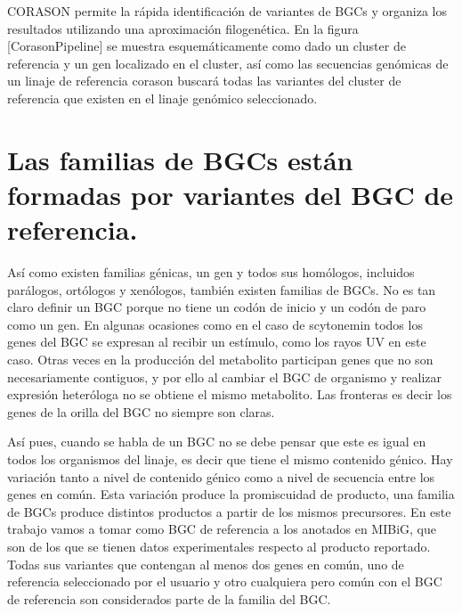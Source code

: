 \documentclass[12pt,twoside]{reedthesis}
\begin{document}
  CORASON permite la rápida identificación de variantes de BGCs y organiza
  los resultados utilizando una aproximación filogenética. En la figura
  {[}CorasonPipeline{]} se muestra esquemáticamente como dado un cluster
  de referencia y un gen localizado en el cluster, así como las secuencias
  genómicas de un linaje de referencia corason buscará todas las variantes
  del cluster de referencia que existen en el linaje genómico
  seleccionado.
  
  \section{Las familias de BGCs están formadas por variantes del BGC de
  referencia.}\label{las-familias-de-bgcs-estan-formadas-por-variantes-del-bgc-de-referencia.}
  
  Así como existen familias génicas, un gen y todos sus homólogos,
  incluidos parálogos, ortólogos y xenólogos, también existen familias de
  BGCs. No es tan claro definir un BGC porque no tiene un codón de inicio
  y un codón de paro como un gen. En algunas ocasiones como en el caso de
  scytonemin todos los genes del BGC se expresan al recibir un estímulo,
  como los rayos UV en este caso. Otras veces en la producción del
  metabolito participan genes que no son necesariamente contiguos, y por
  ello al cambiar el BGC de organismo y realizar expresión heteróloga no
  se obtiene el mismo metabolito. Las fronteras es decir los genes de la
  orilla del BGC no siempre son claras.
  
  Así pues, cuando se habla de un BGC no se debe pensar que este es igual
  en todos los organismos del linaje, es decir que tiene el mismo
  contenido génico. Hay variación tanto a nivel de contenido génico como a
  nivel de secuencia entre los genes en común. Esta variación produce la
  promiscuidad de producto, una familia de BGCs produce distintos
  productos a partir de los mismos precursores. En este trabajo vamos a
  tomar como BGC de referencia a los anotados en MIBiG, que son de los que
  se tienen datos experimentales respecto al producto reportado. Todas sus
  variantes que contengan al menos dos genes en común, uno de referencia
  seleccionado por el usuario y otro cualquiera pero común con el BGC de
  referencia son considerados parte de la familia del BGC.
  
\end{document}

